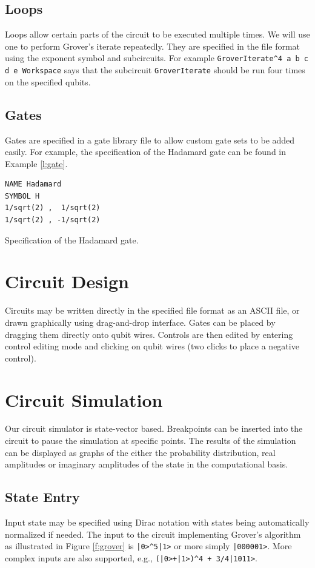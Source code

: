 \documentclass[aps,prl,reprint,floatfix,superscriptaddress]{revtex4-1} %
\begin{document}
\subsection{Loops}
Loops allow certain parts of the circuit to be executed multiple times. We will use one to perform Grover's iterate repeatedly. They are specified in the file format
using the exponent symbol and subcircuits. For example \verb+GroverIterate^4 a b c d e Workspace+ says
that the subcircuit \verb+GroverIterate+ should be run four times on the specified qubits.
\subsection{Gates}
Gates are specified in a gate library file to allow custom gate sets to be added easily. For example, the specification of the Hadamard gate
can be found in Example \ref{l:gate}.
\begin{program}
\begin{verbatim}
NAME Hadamard
SYMBOL H
1/sqrt(2) ,  1/sqrt(2)
1/sqrt(2) , -1/sqrt(2)
\end{verbatim}
\caption{Specification of the Hadamard gate.}
\label{l:gate}
\end{program}
\section{Circuit Design}
Circuits may be written directly in the specified file format as an ASCII file, or drawn graphically using drag-and-drop interface.  Gates can be placed 
by dragging them directly onto qubit wires.
Controls are then edited by entering control editing mode and clicking on qubit wires (two clicks to place a negative control).

\section{Circuit Simulation}
Our circuit simulator is state-vector based.  Breakpoints can be inserted into the circuit to pause the simulation at specific points.  The results of the simulation can be displayed as graphs of the either the probability distribution, real amplitudes or imaginary amplitudes of the state in the computational basis.
\subsection{State Entry}
Input state may be specified using Dirac notation with states being automatically normalized if needed. The input 
to the circuit implementing Grover's algorithm as illustrated in Figure \ref{f:grover} is \verb$|0>^5|1>$ or more simply 
\verb$|000001>$. More complex inputs are also supported, e.g., \verb$(|0>+|1>)^4 + 3/4|1011>$.
\end{document}
